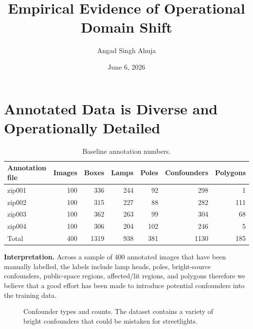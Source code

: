 \documentclass[10pt]{article}
\title{\vspace{-1.3em}\bfseries Empirical Evidence of Operational Domain Shift}
\author{Angad Singh Ahuja}
\date{\vspace{-0.8em}June 6, 2026}
\begin{document}
\maketitle
\vspace{-1.4em}


\section{Annotated Data is Diverse and Operationally Detailed}

\begin{table}[H]
\centering
\caption{Baseline annotation numbers.}
\small
\begin{tabular}{lrrrrrr}
\toprule
Annotation file & Images & Boxes & Lamps & Poles & Confounders & Polygons\\
\midrule
zip001 & 100 & 336 & 244 & 92 & 298 & 1\\
zip002 & 100 & 315 & 227 & 88 & 282 & 111\\
zip003 & 100 & 362 & 263 & 99 & 304 & 68\\
zip004 & 100 & 306 & 204 & 102 & 246 & 5\\
\midrule
Total & 400 & 1319 & 938 & 381 & 1130 & 185\\
\bottomrule
\end{tabular}
\end{table}

\textbf{Interpretation.}
Across a sample of 400 annotated images that have been manually labelled, the labels include lamp heads, poles, bright-source confounders, public-space regions, affected/lit regions, and polygons therefore we believe that a good effort has been made to introduce potential confounders into the training data.

\begin{figure}[H]
\centering
{}
\caption{Confounder types and counts. The dataset contains a variety of bright confounders that could be mistaken for streetlights.}
\end{figure}
\end{document}
